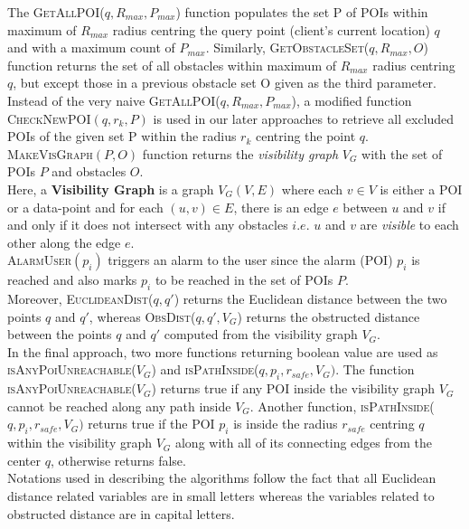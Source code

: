 \documentclass{sig-alternate}
\begin{document}
The \textsc{GetAllPOI}($q, R_{max},P_{max}$) function populates the set P of POIs within maximum of $R_{max}$ radius centring the query point (client's current location) $q$ and with a maximum count of $P_{max}$. Similarly, \textsc{GetObstacleSet}($q, R_{max},O$) function returns the set of all obstacles within maximum of $R_{max}$ radius centring $q$, but except those in a previous obstacle set O given as the third parameter. \\
Instead of the very naive \textsc{GetAllPOI}($q, R_{max},P_{max}$), a modified function \textsc{CheckNewPOI}$(q, r_{k}, P)$ is used in our later approaches to retrieve all excluded POIs of the given set P within the radius $r_{k}$ centring the point $q$. \\
\textsc{MakeVisGraph}$(P,O)$ function returns the \textit{visibility graph} $V_G$ with the set of POIs $P$ and obstacles $O$.\\
Here, a \textbf{Visibility Graph} is a graph $V_G(V,E)$ where each $v \in V$ is either a POI or a data-point and for each $(u,v) \in E$, there is an edge $e$ between $u$ and $v$ if and only if it does not intersect with any obstacles $i.e.$ $u$ and $v$ are \textit{visible} to each other along the edge $e$. \\
\textsc{AlarmUser}$(p_i)$ triggers an alarm to the user since the alarm (POI) $p_i$ is reached and also marks $p_i$ to be reached in the set of POIs $P$. \\  
Moreover, \textsc{EuclideanDist($q, q'$)} returns the Euclidean distance between the two points $q$ and $q'$, whereas \textsc{ObsDist}($q, q', V_G$) returns the obstructed distance between the points $q$ and $q'$ computed from the visibility graph $V_G$.
\\ In the final approach, two more functions returning boolean value are used as \textsc{isAnyPoiUnreachable}($V_G$) and \textsc{isPathInside}($q, p_i, r_{safe}, V_G)$. The function \textsc{isAnyPoiUnreachable}($V_G$) returns true if any POI inside the visibility graph $V_G$ cannot be reached along any path inside $V_G$. Another function, \textsc{isPathInside}($q, p_i, r_{safe}, V_G)$ returns true if the POI $p_i$ is inside the radius $r_{safe}$ centring $q$ within the visibility graph $V_G$ along with all of its connecting edges from the center $q$, otherwise returns false.
\\ Notations used in describing the algorithms follow the fact that all Euclidean distance related variables are in small letters whereas the variables related to obstructed distance are in capital letters.
 
\end{document}
